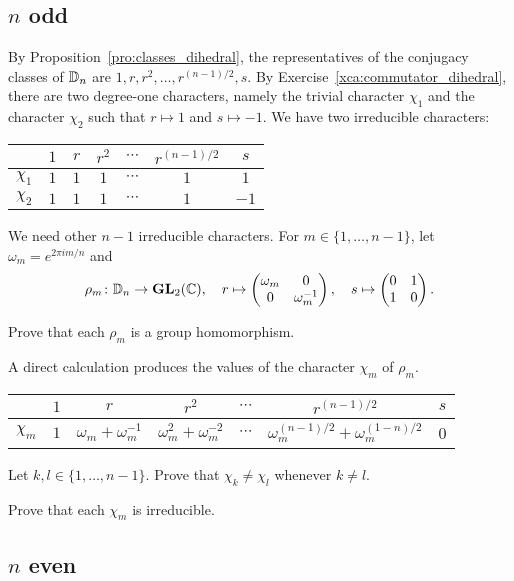 \subsection{$n$ odd}

By Proposition~\ref{pro:classes_dihedral}, the representatives of the conjugacy classes of $\mathbb{D}_n$ are 
$1,r,r^2,\dots,r^{(n-1)/2},s$. 
By Exercise~\ref{xca:commutator_dihedral}, there are two degree-one characters, namely the trivial character $\chi_1$ 
and the character $\chi_2$ such that $r\mapsto 1$ and $s\mapsto -1$. We have
two irreducible characters: 

\bigskip 
\begin{center}
    \begin{tabular}{|c|cccccc|}
         \hline 
         & $1$ & $r$ & $r^2$ & $\cdots$  & $r^{(n-1)/2}$ & $s$\\
         \hline 
         $\chi_1$ & $1$ & $1$ & $1$ & $\cdots$ & $1$ & $1$\\
         $\chi_2$ & $1$ & $1$ & $1$ & $\cdots$ & $1$ & $-1$\\
         \hline 
    \end{tabular}
\end{center}
\bigskip 

We need other $n-1$ irreducible characters. For $m\in\{1,\dots,n-1\}$, let $\omega_m=e^{2\pi im/n}$ and 
\[
\rho_m\colon\mathbb{D}_n\to\mathbf{GL}_2(\mathbb{C}),\quad 
r\mapsto\begin{pmatrix}\omega_m&0\\0&\omega_m^{-1}\end{pmatrix},\quad 
s\mapsto\begin{pmatrix}0&1\\1&0\end{pmatrix}.
\]

\begin{exercise}
    Prove that each $\rho_m$ is a group homomorphism.
\end{exercise}

A direct calculation produces the values of the 
character $\chi_m$ of $\rho_m$.

\bigskip 
\begin{center}
    \begin{tabular}{|c|cccccc|}
         \hline 
         & $1$ & $r$ & $r^2$ & $\cdots$  & $r^{(n-1)/2}$ & $s$\\
         \hline 
         $\chi_m$ & $1$ & $\omega_m+\omega_m^{-1}$ & $\omega_m^2+\omega_m^{-2}$ & $\cdots$ & $\omega_m^{(n-1)/2}+\omega_m^{(1-n)/2}$ & 0\\
         \hline 
    \end{tabular}
\end{center}
\bigskip 

\begin{exercise}
    Let $k,l\in\{1,\dots,n-1\}$. Prove that $\chi_k\ne\chi_l$ whenever $k\ne l$.
\end{exercise}

\begin{exercise}
    Prove that each $\chi_m$ is irreducible. 
\end{exercise}



\subsection{$n$ even}
